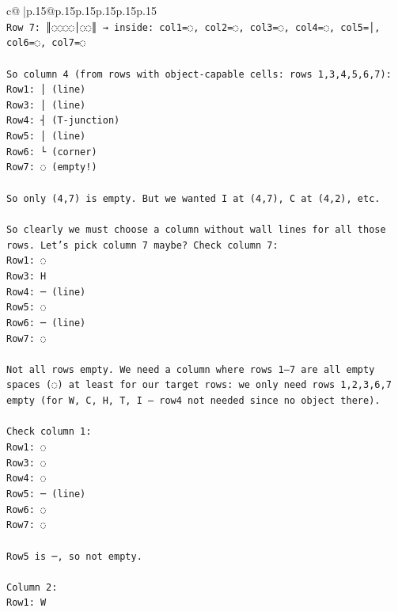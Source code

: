 \documentclass{article}
\begin{document}
{\begin{supertabular}{c@{$\;$}|p{.15\linewidth}@{}p{.15\linewidth}p{.15\linewidth}p{.15\linewidth}p{.15\linewidth}p{.15\linewidth}}
{{{\\ 
\texttt{Row 7: ║◌◌◌◌│◌◌║ → inside: col1=◌, col2=◌, col3=◌, col4=◌, col5=│, col6=◌, col7=◌} \\
\\ 
\texttt{So column 4 (from rows with object{-}capable cells: rows 1,3,4,5,6,7):  } \\
\texttt{Row1: │ (line)  } \\
\texttt{Row3: │ (line)  } \\
\texttt{Row4: ┤ (T{-}junction)  } \\
\texttt{Row5: │ (line)  } \\
\texttt{Row6: └ (corner)  } \\
\texttt{Row7: ◌ (empty!)} \\
\\ 
\texttt{So only (4,7) is empty. But we wanted I at (4,7), C at (4,2), etc.} \\
\\ 
\texttt{So clearly we must choose a column without wall lines for all those rows. Let's pick column 7 maybe? Check column 7:  } \\
\texttt{Row1: ◌  } \\
\texttt{Row3: H  } \\
\texttt{Row4: ─ (line)  } \\
\texttt{Row5: ◌  } \\
\texttt{Row6: ─ (line)  } \\
\texttt{Row7: ◌  } \\
\\ 
\texttt{Not all rows empty. We need a column where rows 1–7 are all empty spaces (◌) at least for our target rows: we only need rows 1,2,3,6,7 empty (for W, C, H, T, I — row4 not needed since no object there).  } \\
\\ 
\texttt{Check column 1:  } \\
\texttt{Row1: ◌  } \\
\texttt{Row3: ◌  } \\
\texttt{Row4: ◌  } \\
\texttt{Row5: ─ (line)  } \\
\texttt{Row6: ◌  } \\
\texttt{Row7: ◌  } \\
\\ 
\texttt{Row5 is ─, so not empty.} \\
\\ 
\texttt{Column 2:  } \\
\texttt{Row1: W  } \\
}}}
\end{supertabular}}
\end{document}
